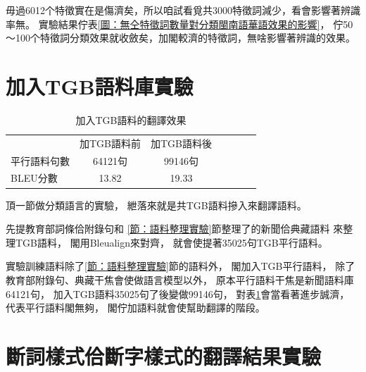 毋過6012个特徵實在是傷濟矣，所以咱試看覓共3000特徵詞減少，看會影響著辨識率無。
實驗結果佇表\ref{圖：無仝特徵詞數量對分類閩南語華語效果的影響}，
佇50～100个特徵詞分類效果就收斂矣，加閣較濟的特徵詞，無啥影響著辨識的效果。

\section{加入TGB語料庫實驗}
\label{節：加入TGB語料庫實驗}

\begin{table}
\caption{加入TGB語料的翻譯效果}
\label{表：加入TGB語料的翻譯效果}
\centering
\begin{tabular}{lcccccc}
& 加TGB語料前 & 加TGB語料後\\
平行語料句數 & 64121句 & 99146句\\
BLEU分數 & 13.82 & 19.33\\
\end{tabular}
\end{table}

頂一節做分類語言的實驗，
紲落來就是共TGB語料摻入來翻譯語料。

先提教育部詞條佮附錄句和
\ref{節：語料整理實驗}節整理了的新聞佮典藏語料
來整理TGB語料，
閣用Bleualign來對齊，
就會使提著35025句TGB平行語料。

實驗訓練語料除了\ref{節：語料整理實驗}節的語料外，
閣加入TGB平行語料，
除了教育部附錄句、典藏干焦會使做語言模型以外，
原本平行語料干焦是新聞語料庫64121句，
加入TGB語料35025句了後變做99146句，
對表\ref{表：加入TGB語料的翻譯效果}會當看著進步誠濟，
代表平行語料閣無夠，
閣佇加語料就會使幫助翻譯的階段。

\section{斷詞樣式佮斷字樣式的翻譯結果實驗}
\label{節：斷詞樣式佮斷字樣式的翻譯結果實驗}


